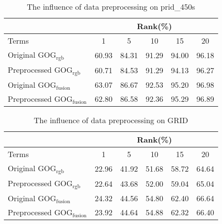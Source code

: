 \begin{table}[H]
\centering
\caption{The influence of data preprocessing on prid\_450s}
\label{compMN4}
\begin{tabular}{|l|c|c|c|c|c|}
\hline
 & \multicolumn{5}{|c|}{Rank(\%)} \\
 \hline
Terms  &1 &5 & 10 &15& 20\\
\hline
Original GOG$_\text{rgb}$&60.93& 84.31& 91.29& 94.00& 96.18\\
\hline
Preprocessed GOG$_\text{rgb}$ &60.71& 84.53& 91.29& 94.13& 96.27\\
\hline
Original GOG$_\text{fusion}$ &63.07& 86.67& 92.53& 95.20& 96.98\\
\hline
Preprocessed GOG$_\text{fusion}$ &62.80& 86.58& 92.36& 95.29& 96.89\\
 \hline
 
\end{tabular}
\end{table}

\begin{table}[H]
\centering
\caption{The influence of data preprocessing on GRID}
\label{compMN5}
\begin{tabular}{|l|c|c|c|c|c|}
\hline
 & \multicolumn{5}{|c|}{Rank(\%)} \\
 \hline
Terms  &1 &5 & 10 &15& 20\\
\hline
Original GOG$_\text{rgb}$&22.96& 41.92& 51.68& 58.72& 64.64\\
\hline
Preprocessed GOG$_\text{rgb}$ &22.64& 43.68& 52.00& 59.04& 65.04\\
\hline
Original GOG$_\text{fusion}$ &24.32& 44.56& 54.80& 62.40& 66.64\\
\hline
Preprocessed GOG$_\text{fusion}$ &23.92& 44.64& 54.88& 62.32& 66.40\\
 \hline
 
\end{tabular}
\end{table}


